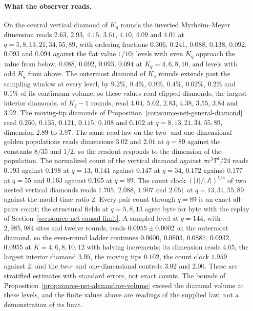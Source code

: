 \paragraph{What the observer reads.}
On the central vertical diamond of $K_q$ rounds the inverted Myrheim--Meyer
dimension reads $2.63$, $2.93$, $4.15$, $3.61$, $4.10$, $4.09$ and $4.07$ at
$q=5,8,13,21,34,55,89$, with ordering fractions $0.306$, $0.241$, $0.088$,
$0.138$, $0.092$, $0.093$ and $0.094$ against the flat value $1/10$; levels
with even $K_q$ approach the value from below, $0.088$, $0.092$, $0.093$,
$0.094$ at $K_q=4,6,8,10$, and levels with odd $K_q$ from above.
The outermost diamond of $K_q$ rounds extends past the sampling window at
every level, by $9.2\%$, $0.4\%$, $0.9\%$, $0.4\%$, $0.02\%$, $0.2\%$ and
$0.1\%$ of its continuum volume, so these values read clipped diamonds; the
largest interior diamonds, of $K_q-1$ rounds, read $4.04$, $5.02$, $2.83$,
$4.38$, $3.55$, $3.84$ and $3.92$.
The moving-tip diamonds of Proposition~\ref{cor:source-net-general-diamond}
read $0.250$, $0.135$, $0.121$, $0.115$, $0.108$ and $0.102$ at
$q=8,13,21,34,55,89$, dimension $2.89$ to $3.97$. The same read law on the
two- and one-dimensional golden populations reads dimensions $3.02$ and
$2.01$ at $q=89$ against the constants $8/35$ and $1/2$, so the readout
responds to the dimension of the population. The normalized count of the
vertical diamond against $\pi c^3T^4/24$ reads $0.193$ against $0.198$ at
$q=13$, $0.141$ against $0.147$ at $q=34$, $0.172$ against $0.177$ at $q=55$
and $0.163$ against $0.165$ at $q=89$. The count clock $(|I|/|J|)^{1/4}$ of
two nested vertical diamonds reads $1.705$, $2.088$, $1.907$ and $2.051$ at
$q=13,34,55,89$ against the model-time ratio $2$. Every pair count through
$q=89$ is an exact all-pairs count; the structural fields at $q=5,8,13$ agree
byte for byte with the replay of Section~\ref{sec:source-net-causal-limit}.
A sampled level at $q=144$, with $2{,}985{,}984$ sites and twelve rounds,
reads $0.0955\pm0.0002$ on the outermost diamond, so the even-round ladder
continues $0.0600$, $0.0803$, $0.0887$, $0.0932$, $0.0955$ at
$K=4,6,8,10,12$ with halving increments; its dimension reads $4.05$, the
largest interior diamond $3.95$, the moving tips $0.102$, the count clock
$1.959$ against $2$, and the two- and one-dimensional controls $3.02$ and
$2.00$. These are stratified estimates with standard errors, not exact
counts. The bounds of
Proposition~\ref{prop:source-net-alexandrov-volume} exceed the diamond
volume at these levels, and the finite values above are readings of the
supplied law, not a demonstration of its limit.

